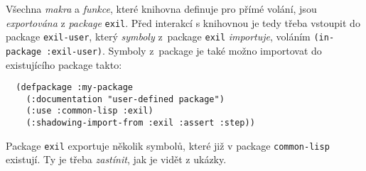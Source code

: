 Všechna \emph{makra} a \emph{funkce}, které knihovna definuje pro přímé volání,
jsou \emph{exportována} z \emph{package} \verb|exil|. Před interakcí s knihovnou
je tedy třeba vstoupit do package \verb|exil-user|, který \emph{symboly} z~package
\verb|exil| \emph{importuje}, voláním \verb|(in-package :exil-user)|. Symboly
z~package je také možno importovat do existujícího package takto:
\begin{verbatim}
  (defpackage :my-package
    (:documentation "user-defined package")
    (:use :common-lisp :exil)
    (:shadowing-import-from :exil :assert :step))
\end{verbatim}
Package \verb|exil| exportuje několik symbolů, které již v package
\verb|common-lisp| existují. Ty je třeba \emph{zastínit}, jak je vidět z ukázky.
